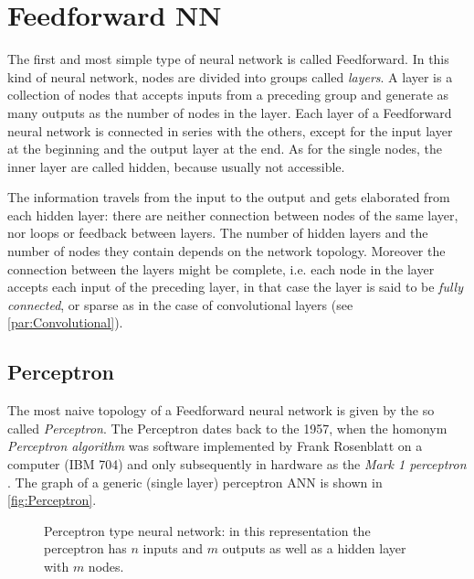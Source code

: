\section{Feedforward NN}
\label{sec:Feedforward_NN}

The first and most simple type of neural network is called Feedforward.
In this kind of neural network, nodes are divided into groups called \textit{layers}.
A layer is a collection of nodes that accepts inputs from a preceding group and generate as many outputs as the number of nodes in the layer.
Each layer of a Feedforward neural network is connected in series with the others, except for the input layer at the beginning and the output layer at the end.
As for the single nodes, the inner layer are called hidden, because usually not accessible.

The information travels from the input to the output and gets elaborated from each hidden layer: there are neither connection between nodes of the same layer, nor loops or feedback between layers.
The number of hidden layers and the number of nodes they contain depends on the network topology.
Moreover the connection between the layers might be complete, i.e. each node in the layer accepts each input of the preceding layer, in that case the layer is said to be \textit{fully connected}, or sparse as in the case of convolutional layers (see \autoref{par:Convolutional}).

\subsection{Perceptron}
\label{ssec:Perceptron}

The most naive topology of a Feedforward neural network is given by the so called \textit{Perceptron}.
The Perceptron dates back to the 1957, when the homonym \textit{Perceptron algorithm} was software implemented by Frank Rosenblatt on a computer (IBM 704) and only subsequently in hardware as the \textit{Mark 1 perceptron} \cite{frank1957perceptron,Rosenblatt1958}.
The graph of a generic (single layer) perceptron \acs{ANN} is shown in \autoref{fig:Perceptron}.

\begin{figure}[ht]
	\centering
	
	\caption{%
		Perceptron type neural network: in this representation the perceptron has $n$ inputs and $m$ outputs as well as a hidden layer with $m$ nodes. %
		}
	\label{fig:Perceptron}
\end{figure}

